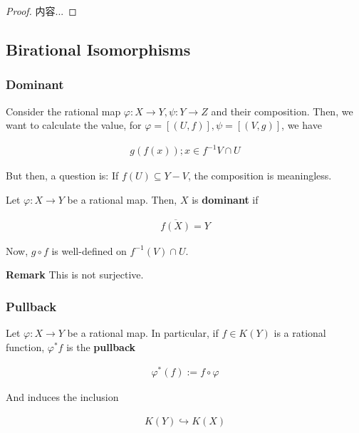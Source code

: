 \documentclass[Total.tex]{subfiles}
\begin{document}
		\begin{proof}
			内容...
		\end{proof}
		
		
		\subsection{Birational Isomorphisms}
		
		\subsubsection{Dominant}
		
		Consider the rational map $\varphi:X\rightarrow Y,\psi:Y\rightarrow Z$ and their composition. Then, we want to calculate the value, for $\varphi=[(U,f)],\psi=[(V,g)]$, we have 
		
		\begin{gather*}
			g(f(x));x\in f^{-1}V\cap U
		\end{gather*} 
		
		But then, a question is: If $f(U)\subseteq Y-V$, the composition is meaningless. 
		
		\begin{Def}
			Let $\varphi:X\rightarrow Y$ be a rational map. Then, $X$ is \textbf{dominant} if
			
			\begin{gather*}
				\overline{f(X)}=Y
			\end{gather*}
		\end{Def}
		
		Now, $g\circ f$ is well-defined on $f^{-1}(V)\cap U$.
		
		\textbf{Remark} This is not surjective.
		
		\subsubsection{Pullback}
		
		\begin{Def}
			Let $\varphi:X\rightarrow Y$ be a rational map. In particular, if $f\in K(Y)$ is a rational function, $\varphi^*f$ is the \textbf{pullback}
			
			\begin{gather*}
				\varphi^*(f):=f\circ \varphi
			\end{gather*}
			
			And induces the inclusion 
			
			\begin{gather*}
				K(Y)\hookrightarrow K(X)
			\end{gather*}
		\end{Def}
		
\end{document}
